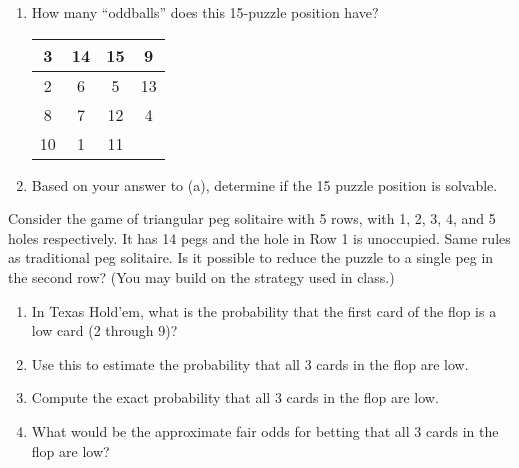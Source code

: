 \documentclass[12pt,letterpaper]{hmcpset}
\begin{document}

\begin{problem}[1]
  \begin{enumerate}[label=(\alph*)]
  \item How many ``oddballs'' does this 15-puzzle position have?
    
    \centering
    \begin{tabular}{|c|c|c|c|}
      \hline
      3  & 14 & 15 & 9  \\ \hline
      2  & 6  & 5  & 13 \\ \hline
      8  & 7  & 12 & 4  \\ \hline
      10 & 1  & 11 & \\ \hline
    \end{tabular}
    
  \item Based on your answer to (a), determine if the 15 puzzle position is solvable.
  \end{enumerate}
\end{problem}
\begin{solution}
\end{solution}
\pagebreak

\begin{problem}[2]
  Consider the game of triangular peg solitaire with 5 rows, with 1, 2, 3, 4, and 5 holes respectively.
  It has 14 pegs and the hole in Row 1 is unoccupied.
  Same rules as traditional peg solitaire.
  Is it possible to reduce the puzzle to a single peg in the second row?
  (You may build on the strategy used in class.)
\end{problem}
\begin{solution}
\end{solution}
\pagebreak

\begin{problem}[3]
  \begin{enumerate}[label=(\alph*)]
  \item In Texas Hold'em, what is the probability that the first card of the flop is a low card (2 through 9)?
  \item Use this to estimate the probability that all 3 cards in the flop are low.
  \item Compute the exact probability that all 3 cards in the flop are low.
  \item What would be the approximate fair odds for betting that all 3 cards in the flop are low?
  \end{enumerate}
\end{problem}
\begin{solution}
\end{solution}
\pagebreak
\end{document}
